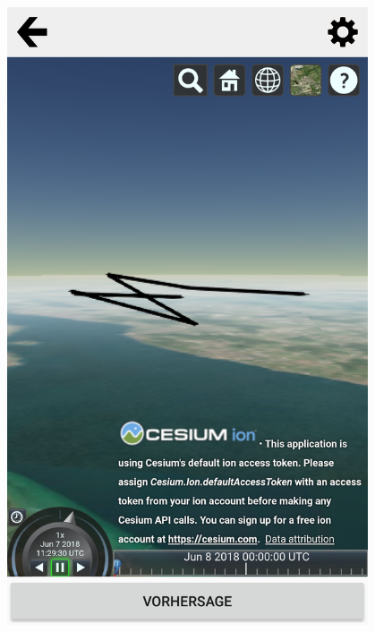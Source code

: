 \documentclass[xcolor=dvipsnames]{beamer}
\begin{document}
\begin{frame}
\begin{columns}
\begin{column}{0.5\textwidth}
\begin{center}
		\includegraphics[width=0.8\textwidth]{screenshots/cesium-prediction2.png}
		\end{center}
	\end{column}
	\end{columns}
\end{frame}
\end{document}
